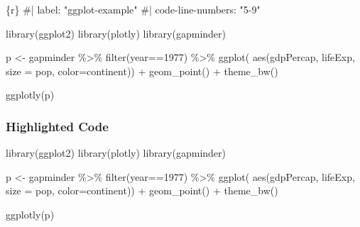 \documentclass[
  letterpaper,
  DIV=11,
  numbers=noendperiod]{scrartcl}
\newenvironment{Shaded}{\begin{snugshade}}{\end{snugshade}}
\newcommand{\AttributeTok}[1]{\textcolor[rgb]{0.40,0.45,0.13}{#1}}
\newcommand{\CommentTok}[1]{\textcolor[rgb]{0.37,0.37,0.37}{#1}}
\newcommand{\DecValTok}[1]{\textcolor[rgb]{0.68,0.00,0.00}{#1}}
\newcommand{\FunctionTok}[1]{\textcolor[rgb]{0.28,0.35,0.67}{#1}}
\newcommand{\InformationTok}[1]{\textcolor[rgb]{0.37,0.37,0.37}{#1}}
\newcommand{\NormalTok}[1]{\textcolor[rgb]{0.00,0.23,0.31}{#1}}
\newcommand{\OtherTok}[1]{\textcolor[rgb]{0.00,0.23,0.31}{#1}}
\newcommand{\SpecialCharTok}[1]{\textcolor[rgb]{0.37,0.37,0.37}{#1}}
\begin{document}
\begin{Shaded}
\begin{Highlighting}[]

\InformationTok{\textasciigrave{}\textasciigrave{}\textasciigrave{}\{r\}}
\CommentTok{\#| label: "ggplot{-}example"}
\CommentTok{\#| code{-}line{-}numbers: "5{-}9"}

\FunctionTok{library}\NormalTok{(ggplot2)}
\FunctionTok{library}\NormalTok{(plotly)}
\FunctionTok{library}\NormalTok{(gapminder)}

\NormalTok{p }\OtherTok{\textless{}{-}}\NormalTok{ gapminder }\SpecialCharTok{\%\textgreater{}\%}
  \FunctionTok{filter}\NormalTok{(year}\SpecialCharTok{==}\DecValTok{1977}\NormalTok{) }\SpecialCharTok{\%\textgreater{}\%}
  \FunctionTok{ggplot}\NormalTok{( }\FunctionTok{aes}\NormalTok{(gdpPercap, lifeExp, }\AttributeTok{size =}\NormalTok{ pop, }\AttributeTok{color=}\NormalTok{continent)) }\SpecialCharTok{+}
  \FunctionTok{geom\_point}\NormalTok{() }\SpecialCharTok{+}
  \FunctionTok{theme\_bw}\NormalTok{()}

\FunctionTok{ggplotly}\NormalTok{(p)}


\InformationTok{\textasciigrave{}\textasciigrave{}\textasciigrave{}}
\end{Highlighting}
\end{Shaded}

\subsubsection{Highlighted Code}

\begin{Shaded}
\begin{Highlighting}[numbers=left,,]
\FunctionTok{library}\NormalTok{(ggplot2)}
\FunctionTok{library}\NormalTok{(plotly)}
\FunctionTok{library}\NormalTok{(gapminder)}

\NormalTok{p }\OtherTok{\textless{}{-}}\NormalTok{ gapminder }\SpecialCharTok{\%\textgreater{}\%}
  \FunctionTok{filter}\NormalTok{(year}\SpecialCharTok{==}\DecValTok{1977}\NormalTok{) }\SpecialCharTok{\%\textgreater{}\%}
  \FunctionTok{ggplot}\NormalTok{( }\FunctionTok{aes}\NormalTok{(gdpPercap, lifeExp, }\AttributeTok{size =}\NormalTok{ pop, }\AttributeTok{color=}\NormalTok{continent)) }\SpecialCharTok{+}
  \FunctionTok{geom\_point}\NormalTok{() }\SpecialCharTok{+}
  \FunctionTok{theme\_bw}\NormalTok{()}

\FunctionTok{ggplotly}\NormalTok{(p)}
\end{Highlighting}
\end{Shaded}
\end{document}

